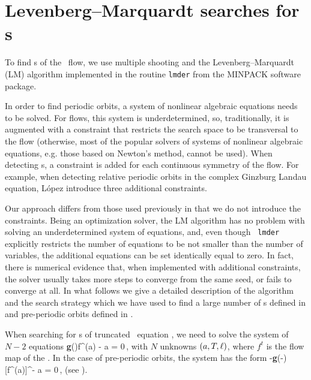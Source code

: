 
\section{Levenberg--Marquardt searches for \rpo s}
\label{sec:lmderRLD}

To find \rpo s of the \KS\ flow, we use multiple shooting and
the Levenberg--Marquardt (LM) algorithm implemented in the routine
{\tt lmder} from the MINPACK software package.

In order to find periodic orbits, a system of nonlinear
algebraic equations needs to be solved.  For flows, this
system is underdetermined, so, traditionally, it is augmented
with a constraint that restricts the search space to be
transversal to the flow (otherwise, most of the popular
solvers of systems of nonlinear algebraic equations, e.g.
those based on Newton's method, cannot be used). When
detecting \rpo s, a constraint is added for each continuous
symmetry of the flow.  For example, when detecting relative
periodic orbits in the complex Ginzburg Landau equation,
L{\'o}pez {\etal} introduce three additional
constraints.

Our approach differs from those used previously in that we do
not introduce the constraints.  Being an optimization solver,
the LM algorithm has no problem with solving an
underdetermined system of equations, and, even though {\tt
lmder} explicitly restricts the number of equations to be not
smaller than the number of variables, the additional
equations can be set identically equal to
zero.  In fact, there is numerical
evidence that, when implemented with additional constraints,
the solver usually takes more steps to converge from the same
seed, or fails to converge at all. In what
follows we give a detailed description of the algorithm and
the search strategy which we have used to find a large number
of \rpo s defined in  and pre-periodic orbits
defined in .


When searching for \rpo s of truncated \KS\ equation
, we need to solve the system of $N-2$ equations
\beq
  {\bf g}(\shift)f^\period{}(a) - a = 0\,,
with $N$ unknowns $(a, {T_{}}, \ell)$, where $f^t$
is the flow map of the \KSe.  In the case of pre-periodic orbits, the system has
the form
\beq
  -{\bf g}(-\shift)[f^\period{}(a)]^\ast - a = 0\,,
(see ).

